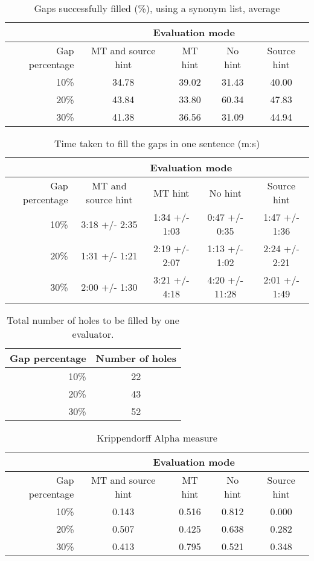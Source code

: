 \documentclass[11pt, oneside]{article}   	%
\begin{document}
\begin{table}
\centering
\begin{tabular}{|r |*{4}{c}|}
\hline
 &\multicolumn{4}{c|}{Evaluation mode}\\
\hline
Gap percentage & MT and source hint & MT hint & No hint & Source hint\\
\hline
10\%&34.78&39.02&31.43&40.00\\
20\%&43.84&33.80&60.34&47.83\\
30\%&41.38&36.56&31.09&44.94\\
\hline
\end{tabular}
\caption {Gaps successfully filled (\%), using a synonym list, average} \label{tab:title} 
\end{table}

\begin{table}
\centering
\begin{tabular}{|r |*{4}{c}|}
\hline
 &\multicolumn{4}{c|}{Evaluation mode}\\
\hline
Gap percentage & MT and source hint & MT hint & No hint & Source hint\\
\hline
10\%&3:18 +/- 2:35&1:34 +/- 1:03&0:47 +/- 0:35&1:47 +/- 1:36\\
20\%&1:31 +/- 1:21&2:19 +/- 2:07&1:13 +/- 1:02&2:24 +/- 2:21\\
30\%&2:00 +/- 1:30&3:21 +/- 4:18&4:20 +/- 11:28&2:01 +/- 1:49\\
\hline
\end{tabular}
\caption {Time taken to fill the gaps in one sentence (m:s)} \label{tab:title} 
\end{table}

\begin{table}
\centering
\begin{tabular}{|r |*{1}{c}|}
\hline
Gap percentage & Number of holes\\
\hline
10\%&22\\
20\%&43\\
30\%&52\\
\hline
\end{tabular}
\caption {Total number of holes to be filled by one evaluator.} \label{tab:title}
\end{table}

\begin{table}
\centering
\begin{tabular}{|r |*{4}{c}|}
\hline
 &\multicolumn{4}{c|}{Evaluation mode}\\
\hline
Gap percentage & MT and source hint & MT hint & No hint & Source hint\\
\hline
10\%&0.143&0.516&0.812&0.000\\
20\%&0.507&0.425&0.638&0.282\\
30\%&0.413&0.795&0.521&0.348\\
\hline
\end{tabular}
\caption {Krippendorff Alpha measure} \label{tab:title}
\end{table}
\end{document}
